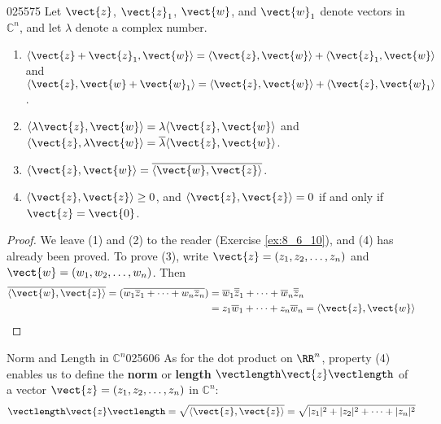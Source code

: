 \begin{theorem}{}{025575}
Let $\vect{z}$, $\vect{z}_{1}$, $\vect{w}$, and $\vect{w}_{1}$ denote vectors in $\mathbb{C}^n$, and let $\lambda$ denote a complex number.
\begin{enumerate}
\item $\langle \vect{z} + \vect{z}_{1}, \vect{w}\rangle = \langle \vect{z}, \vect{w} \rangle + \langle \vect{z}_{1}, \vect{w} \rangle$ \quad and \quad 
$\langle \vect{z}, \vect{w} + \vect{w}_{1} \rangle = \langle \vect{z}, \vect{w} \rangle + \langle \vect{z}, \vect{w}_{1} \rangle$.

\item $\langle \lambda \vect{z}, \vect{w} \rangle = \lambda \langle \vect{z}, \vect{w} \rangle$ \quad and \quad $\langle \vect{z}, \lambda \vect{w} \rangle = \overline{\lambda} \langle \vect{z}, \vect{w} \rangle$.

\item $\langle \vect{z}, \vect{w} \rangle = \overline{\langle \vect{w}, \vect{z} \rangle}$.

\item $\langle \vect{z}, \vect{z} \rangle \geq 0$, \quad and \quad $\langle \vect{z}, \vect{z} \rangle = 0$ if and only if $\vect{z} = \vect{0}$.

\end{enumerate}
\end{theorem}

\begin{proof}
We leave (1) and (2) to the reader (Exercise \ref{ex:8_6_10}), and (4) has already been proved. To prove (3), write $\vect{z} = (z_{1}, z_{2}, \dots, z_{n})$ and $\vect{w} = (w_{1}, w_{2}, \dots, w_{n})$. Then
\begin{align*}
\overline{\langle \vect{w}, \vect{z} \rangle} = (\overline{w_{1}\overline{z}_{1} + \dots + w_{n}\overline{z}_{n}}) &= \overline{w}_{1}\overline{\overline{z}}_{1} + \dots + \overline{w}_{n}\overline{\overline{z}}_{n} \\
&= z_{1}\overline{w}_{1} + \dots + z_{n}\overline{w}_{n} = \langle \vect{z}, \vect{w} \rangle
\end{align*}
\end{proof}

\begin{definition}{Norm and Length in $\mathbb{C}^n$}{025606}
As for the dot product on $\RR^n$, property (4) enables us to define the \textbf{norm} or \textbf{length} $\vectlength\vect{z}\vectlength$ of a vector $\vect{z} = (z_{1}, z_{2}, \dots, z_{n})$ in $\mathbb{C}^n$:
\begin{equation*}
\vectlength \vect{z} \vectlength = \sqrt{\langle \vect{z}, \vect{z} \rangle} = \sqrt{|z_{1}|^2 + |z_{2}|^2 + \dots + |z_{n}|^2}
\end{equation*}
\end{definition}

